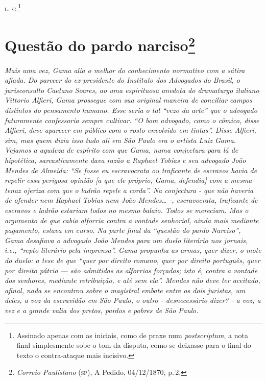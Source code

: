 \textsc{l. g.}\footnote{ Assinado apenas com as iniciais, como de praxe num
  \emph{postscriptum}, a nota final simplesmente sobe o tom da disputa,
  como se deixasse para o final do texto o contra-ataque mais incisivo.}

\chapter{Questão do pardo narciso\footnote{\emph{Correio Paulistano} (\textsc{sp}), A Pedido, 04/12/1870,
  p.\,2.}} %

\begin{didascalia}
\emph{Mais uma vez, Gama alia o melhor do conhecimento normativo com a
sátira afiada. Do parecer do ex-presidente do Instituto dos Advogados do
Brasil, o jurisconsulto Caetano Soares, ao uma espirituosa anedota do
dramaturgo italiano Vittorio Alfieri, Gama prossegue com sua original
maneira de conciliar campos distintos do pensamento humano. Esse seria o
tal ``vezo da arte'' que o advogado futuramente confessaria sempre
cultivar. ``O bom advogado, como o cômico, disse Alfieri, deve aparecer
em público com o rosto envolvido em tintas''. Disse Alfieri, sim, mas
quem dizia isso tudo ali em São Paulo era o artista Luiz Gama. Vejamos a
agudeza de espírito com que Gama, numa conjectura para lá de hipotética,
sarcasticamente dava razão a Raphael Tobias e seu advogado João Mendes
de Almeida: ``Se fosse eu escravocrata ou traficante de escravos havia de
repelir essa perigosa opinião {[}a que ele próprio, Gama, defendia{]}
com a mesma tenaz ojeriza com que o ladrão repele a corda''. Na
conjectura - que não haveria de ofender nem Raphael Tobias nem João
Mendes\ldots{} -, escravocrata, traficante de escravos e ladrão estariam
todos no mesmo balaio. Todos se mereciam. Mas o argumento de que cabia
alforria contra a vontade senhorial, ainda mais mediante pagamento,
estava em curso. Na parte final da ``questão do pardo Narciso'', Gama
desafiava o advogado João Mendes para um duelo literário nos jornais,
i.e., ``repto literário pela imprensa''. Gama propunha as armas, quer
dizer, o mote do duelo: a tese de que ``quer por direito romano, quer por
direito português, quer por direito pátrio --- são admitidas as
alforrias forçadas; isto é, contra a vontade dos senhores, mediante
retribuição, e até sem ela''. Mendes não deve ter aceitado, afinal, nada
se encontrou sobre o magistral embate entre os dois juristas, um deles,
a voz da escravidão em São Paulo, o outro - desnecessário dizer? - a
voz, a vez e a grande valia dos pretos, pardos e pobres de São Paulo.}
\end{didascalia}

